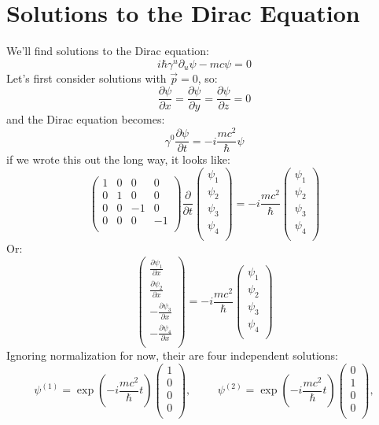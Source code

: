 \documentclass[12pt]{book}
\begin{document}
\section{Solutions to the Dirac Equation}

We'll find solutions to the Dirac equation:
$$i\hbar \gamma^u \partial_u \psi -mc \psi = 0$$
Let's first consider solutions with $\vec{p}=0$, so:
$$\frac{\partial\psi}{\partial x} = \frac{\partial\psi}{\partial y} = \frac{\partial\psi}{\partial z} = 0$$
and the Dirac equation becomes:
$$\gamma^0 \frac{\partial \psi}{\partial t} = -i \frac{mc^2}{\hbar} \psi $$
if we wrote this out the long way, it looks like:
$$
\begin{pmatrix} 
1 & 0 & 0 & 0\\
0 & 1 & 0 & 0\\
0 & 0 &-1 & 0\\
0 & 0 & 0 &-1\\
\end{pmatrix}
\frac{\partial}{\partial t}
\begin{pmatrix} 
\psi_1\\
\psi_2\\
\psi_3\\
\psi_4\\
\end{pmatrix}
=
-i \frac{mc^2}{\hbar}
\begin{pmatrix} 
\psi_1\\
\psi_2\\
\psi_3\\
\psi_4\\
\end{pmatrix}
$$
Or:
$$
\begin{pmatrix} 
\displaystyle \frac{\partial \psi_1}{\partial x}\\[8pt]
\displaystyle \frac{\partial \psi_2}{\partial x}\\[8pt]
\displaystyle -\frac{\partial \psi_3}{\partial x}\\[8pt]
\displaystyle -\frac{\partial \psi_4}{\partial x}\\[8pt]
\end{pmatrix}
=
-i \frac{mc^2}{\hbar}
\begin{pmatrix} 
\psi_1\\
\psi_2\\
\psi_3\\
\psi_4\\
\end{pmatrix}
$$
Ignoring normalization for now, their are four independent solutions:
$$
\psi^{(1)} = \exp\left(- i \frac{mc^2}{\hbar} t\right)
\begin{pmatrix} 
1\\
0\\
0\\
0\\
\end{pmatrix},
\hspace{1cm}
\psi^{(2)} = \exp\left(- i \frac{mc^2}{\hbar} t\right)
\begin{pmatrix} 
0\\
1\\
0\\
0\\
\end{pmatrix},
$$
\end{document}

